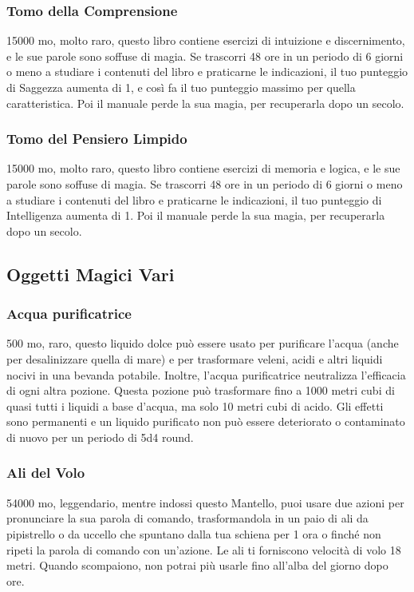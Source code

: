 \begin{multicols}{2}
\subsubsection*{Tomo della Comprensione}
15000 mo, molto raro, questo libro contiene esercizi di intuizione e discernimento, e le sue parole sono soffuse di magia. Se trascorri 48 ore in un periodo di 6 giorni o meno a studiare i contenuti del libro e praticarne le indicazioni, il tuo punteggio di Saggezza aumenta di 1, e così fa il tuo punteggio massimo per quella caratteristica. Poi il manuale perde la sua magia, per recuperarla dopo un secolo.

\subsubsection*{Tomo del Pensiero Limpido}
15000 mo, molto raro, questo libro contiene esercizi di memoria e logica, e le sue parole sono soffuse di magia. Se trascorri 48 ore in un periodo di 6 giorni o meno a studiare i contenuti del libro e praticarne le indicazioni, il tuo punteggio di Intelligenza aumenta di 1. Poi il manuale perde la sua magia, per recuperarla dopo un secolo.

\subsection{Oggetti Magici Vari}

\subsubsection*{Acqua purificatrice}
500 mo, raro, questo liquido dolce può essere usato per purificare l’acqua (anche per desalinizzare quella di mare) e per trasformare veleni, acidi e altri liquidi nocivi in una bevanda potabile. Inoltre, l’acqua purificatrice neutralizza l'efficacia di ogni altra pozione. Questa pozione può trasformare fino a 1000 metri cubi di quasi tutti i liquidi a base d’acqua, ma solo 10 metri cubi di acido. Gli effetti sono permanenti e un liquido purificato non può essere deteriorato o contaminato di nuovo per un periodo di 5d4 round.

\subsubsection*{Ali del Volo}
54000 mo, leggendario, mentre indossi questo Mantello, puoi usare due azioni per pronunciare la sua parola di comando, trasformandola in un paio di ali da pipistrello o da uccello che spuntano dalla tua schiena per 1 ora o finché non ripeti la parola di comando con un'azione. Le ali ti forniscono velocità di volo 18 metri. Quando scompaiono, non potrai più usarle fino all'alba del giorno dopo ore.


\end{multicols}
